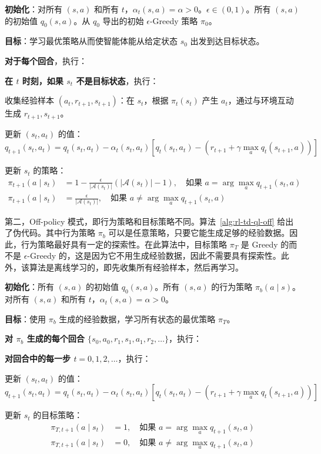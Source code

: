 \begin{algo}
\label{alg:rl-td-ql-on}
\textbf{初始化}：对所有 $(s, a)$ 和所有 $t$，$\alpha_t(s, a) = \alpha > 0$。$\epsilon \in (0, 1)$。所有 $(s, a)$ 的初始值 $q_0(s, a)$。从 $q_0$ 导出的初始 $\epsilon$-Greedy 策略 $\pi_0$。

\textbf{目标}：学习最优策略从而使智能体能从给定状态 $s_0$ 出发到达目标状态。

\textbf{对于每个回合}，执行：

\quad \textbf{在 $t$ 时刻，如果 $s_t$ 不是目标状态}，执行：

\qquad 收集经验样本 $(a_t, r_{t+1}, s_{t+1})$：在 $s_t$，根据 $\pi_t(s_t)$ 产生 $a_t$，通过与环境互动生成 $r_{t+1}, s_{t+1}$。

\qquad 更新 $(s_t, a_t)$ 的值：
\[
  q_{t+1}(s_t, a_t) = q_t(s_t, a_t) - \alpha_t(s_t, a_t) \left[ q_t(s_t, a_t) - (r_{t+1} + \gamma \max_a q_t(s_{t+1}, a)) \right]
\]

\qquad 更新 $s_t$ 的策略：
\begin{align*}
  \pi_{t+1}(a \mid s_t) &= 1 - \frac{\epsilon}{|\mathcal{A}(s_t)|} (|\mathcal{A}(s_t)| - 1), \quad \text{如果 } a = \arg\max_a q_{t+1}(s_t, a) \\
  \pi_{t+1}(a \mid s_t) &= \frac{\epsilon}{|\mathcal{A}(s_t)|}, \quad \text{如果 } a \neq \arg\max_a q_{t+1}(s_t, a)
\end{align*}
\end{algo}

第二，Off-policy 模式，即行为策略和目标策略不同。算法~\ref{alg:rl-td-ql-off} 给出了伪代码。其中行为策略 $\pi_b$ 可以是任意策略，只要它能生成足够的经验数据。因此，行为策略最好具有一定的探索性。在此算法中，目标策略 $\pi_T$ 是 Greedy 的而不是 $\epsilon$-Greedy 的，这是因为它不用生成经验数据，因此不需要具有探索性。此外，该算法是离线学习的，即先收集所有经验样本，然后再学习。

\begin{algo}
\label{alg:rl-td-ql-off}
\textbf{初始化}：所有 $(s, a)$ 的初始值 $q_0(s, a)$。所有 $(s, a)$ 的行为策略 $\pi_b(a \mid s)$。对所有 $(s, a)$ 和所有 $t$，$\alpha_t(s, a) = \alpha > 0$。

\textbf{目标}：使用 $\pi_b$ 生成的经验数据，学习所有状态的最优策略 $\pi_T$。

\textbf{对 $\pi_b$ 生成的每个回合 $\{s_0, a_0, r_1, s_1, a_1, r_2, \ldots\}$}，执行：

\quad \textbf{对回合中的每一步 $t = 0, 1, 2, \ldots$}，执行：

\qquad 更新 $(s_t, a_t)$ 的值：
\[
  q_{t+1}(s_t, a_t) = q_t(s_t, a_t) - \alpha_t(s_t, a_t) \left[ q_t(s_t, a_t) - (r_{t+1} + \gamma \max_a q_t(s_{t+1}, a)) \right]
\]

\qquad 更新 $s_t$ 的目标策略：
\begin{align*}
  \pi_{T, t+1}(a \mid s_t) &= 1, \quad \text{如果 } a = \arg\max_a q_{t+1}(s_t, a) \\
  \pi_{T, t+1}(a \mid s_t) &= 0, \quad \text{如果 } a \neq \arg\max_a q_{t+1}(s_t, a)
\end{align*}
\end{algo}

